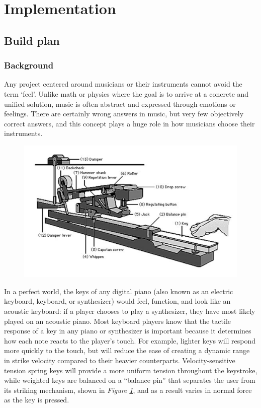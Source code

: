 \section{Implementation}

\subsection{Build plan}

\subsubsection{Background}

Any project centered around musicians or their instruments cannot avoid the term ‘feel’. Unlike math or physics where the goal is to arrive at a concrete and unified solution, music is often abstract and expressed through emotions or feelings. There are certainly wrong answers in music, but very few objectively correct answers, and this concept plays a huge role in how musicians choose their instruments.

\begin{figure}[h!]
  \centering
  \includegraphics[width=\linewidth]{image/KeyMechanism.png}
  \caption{}
  \label{fig:key_mechanism}
\end{figure}

In a perfect world, the keys of any digital piano (also known as an electric keyboard, keyboard, or synthesizer) would feel, function, and look like an acoustic keyboard: if a player chooses to play a synthesizer, they have most likely played on an acoustic piano. Most keyboard players know that the tactile response of a key in any piano or synthesizer is important because it determines how each note reacts to the player’s touch. For example, lighter keys will respond more quickly to the touch, but will reduce the ease of creating a dynamic range in strike velocity compared to their heavier counterparts. Velocity-sensitive tension spring keys will provide a more uniform tension throughout the keystroke, while weighted keys are balanced on a “balance pin” that separates the user from its striking mechanism, shown in \textit{Figure \ref{fig:key_mechanism}}, and as a result varies in normal force as the key is pressed.

